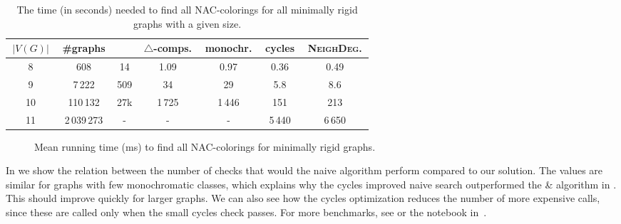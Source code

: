 \begin{table}[t]
	\caption[Running times on minimally rigid graphs.]{
		The time (in seconds) needed to find all NAC-colorings for all minimally rigid graphs with a given size.}%
	\label{tab:allMinRigid}
	\vspace{0.3cm}
	\centering
	\begin{tabular}{ccccccc}
		\hline
		\,$|V(G)|$\, & \,\#graphs\, & \,\flexrilog{}\, & \,$\triangle$-comps.\, & \,monochr.\, & \,cycles\, & \,\textsc{NeighDeg.}\, \\
		\hline
		8            & 608          & 14               & 1.09                   & 0.97         & 0.36       & 0.49                   \\
		9            & 7\,222       & 509              & 34                     & 29           & 5.8        & 8.6                    \\
		10           & 110\,132     & 27k              & 1\,725                 & 1\,446       & 151        & 213                    \\
		11           & 2\,039\,273  & -                & -                      & -            & 5\,440     & 6\,650                 \\
		\hline
	\end{tabular}
\end{table}

\begin{figure}[t]
	\centering
	\scalebox{0.5}{}
	\caption[Running time for minimally rigid graphs.]{
		Mean running time (ms) to find all NAC-colorings for minimally rigid graphs.}%
	\label{fig:graph_time_minimally_rigid}
\end{figure}

In  we show the relation between the number of checks \IsNACColoring{} that
would the naive algorithm perform compared to our solution.
The values are similar for graphs with few monochromatic classes,
which explains why the cycles improved naive search outperformed
the \NeighborsDegree{}\&\MergeLinear{} algorithm in . This should improve quickly for larger graphs.
We can also see how the cycles optimization
reduces the number of more expensive \IsNACColoring{} calls,
since these are called only when the small cycles check \CycleMask{} passes.
For more benchmarks, see  or the notebook in~\cite{pyrigi_github_lastaapps}.

